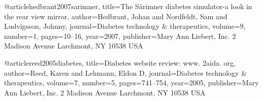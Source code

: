 @article{hedbrant2007sarimner,
  title={The S{\"a}rimner diabetes simulator-a look in the rear view mirror},
  author={Hedbrant, Johan and Nordfeldt, Sam and Ludvigsson, Johnny},
  journal={Diabetes technology \& therapeutics},
  volume={9},
  number={1},
  pages={10--16},
  year={2007},
  publisher={Mary Ann Liebert, Inc. 2 Madison Avenue Larchmont, NY 10538 USA}
}




@article{reed2005diabetes,
  title={Diabetes website review: www. 2aida. org},
  author={Reed, Karen and Lehmann, Eldon D},
  journal={Diabetes technology \& therapeutics},
  volume={7},
  number={5},
  pages={741--754},
  year={2005},
  publisher={Mary Ann Liebert, Inc. 2 Madison Avenue Larchmont, NY 10538 USA}
}